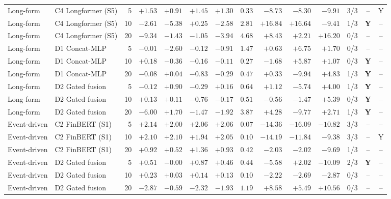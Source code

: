\begin{table}[p]
\begin{tabular}{@{}llrrrrrrrrrrcc@{}}
Long-form & C4 Longformer (S5) & 5 & $+1.53$ & $+0.91$ & $+1.45$ & $+1.30$ & $0.33$ & $-8.73$ & $-8.30$ & $-9.91$ & 3/3 & -- & Y \\
Long-form & C4 Longformer (S5) & 10 & $-2.61$ & $-5.38$ & $+0.25$ & $-2.58$ & $2.81$ & $+16.84$ & $+16.64$ & $-9.41$ & 1/3 & \textbf{Y} & -- \\
Long-form & C4 Longformer (S5) & 20 & $-9.34$ & $-1.43$ & $-1.05$ & $-3.94$ & $4.68$ & $+8.43$ & $+2.21$ & $+16.20$ & 0/3 & -- & -- \\
Long-form & D1 Concat-MLP & 5 & $-0.01$ & $-2.60$ & $-0.12$ & $-0.91$ & $1.47$ & $+0.63$ & $+6.75$ & $+1.70$ & 0/3 & -- & -- \\
Long-form & D1 Concat-MLP & 10 & $+0.18$ & $-0.36$ & $-0.16$ & $-0.11$ & $0.27$ & $-1.68$ & $+5.87$ & $+1.07$ & 0/3 & \textbf{Y} & -- \\
Long-form & D1 Concat-MLP & 20 & $-0.08$ & $+0.04$ & $-0.83$ & $-0.29$ & $0.47$ & $+0.33$ & $-9.94$ & $+4.83$ & 1/3 & \textbf{Y} & -- \\
Long-form & D2 Gated fusion & 5 & $-0.12$ & $+0.90$ & $-0.29$ & $+0.16$ & $0.64$ & $+1.12$ & $-5.74$ & $+4.00$ & 1/3 & \textbf{Y} & -- \\
Long-form & D2 Gated fusion & 10 & $+0.13$ & $+0.11$ & $-0.76$ & $-0.17$ & $0.51$ & $-0.56$ & $-1.47$ & $+5.39$ & 0/3 & \textbf{Y} & -- \\
Long-form & D2 Gated fusion & 20 & $-6.00$ & $+1.70$ & $-1.47$ & $-1.92$ & $3.87$ & $+4.28$ & $-9.77$ & $+2.71$ & 1/3 & \textbf{Y} & -- \\
\addlinespace
Event-driven & C2 FinBERT (S1) & 5 & $+2.14$ & $+2.00$ & $+2.06$ & $+2.06$ & $0.07$ & $-14.36$ & $-16.09$ & $-10.82$ & 3/3 & -- & -- \\
Event-driven & C2 FinBERT (S1) & 10 & $+2.10$ & $+2.10$ & $+1.94$ & $+2.05$ & $0.10$ & $-14.19$ & $-11.84$ & $-9.38$ & 3/3 & -- & Y \\
Event-driven & C2 FinBERT (S1) & 20 & $+0.92$ & $+0.52$ & $+1.36$ & $+0.93$ & $0.42$ & $-2.03$ & $-2.02$ & $-9.69$ & 1/3 & -- & -- \\
Event-driven & D2 Gated fusion & 5 & $+0.51$ & $-0.00$ & $+0.87$ & $+0.46$ & $0.44$ & $-5.58$ & $+2.02$ & $-10.09$ & 2/3 & \textbf{Y} & -- \\
Event-driven & D2 Gated fusion & 10 & $+0.23$ & $+0.03$ & $+0.14$ & $+0.13$ & $0.10$ & $-2.22$ & $-2.69$ & $-2.87$ & 0/3 & -- & -- \\
Event-driven & D2 Gated fusion & 20 & $-2.87$ & $-0.59$ & $-2.32$ & $-1.93$ & $1.19$ & $+8.58$ & $+5.49$ & $+10.56$ & 0/3 & -- & -- \\
\bottomrule
\end{tabular}
\end{table}

